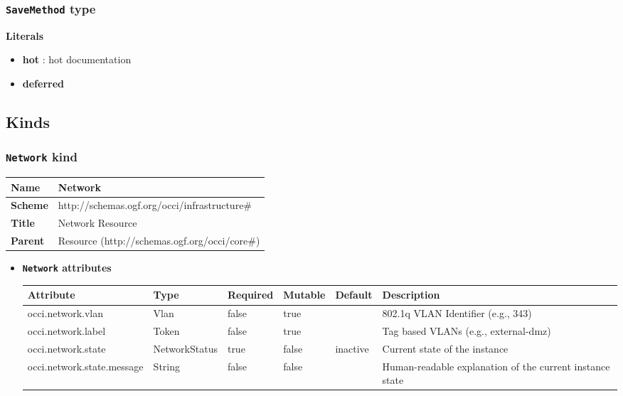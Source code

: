 \subsubsection{\texttt{SaveMethod} type}

\textbf{Literals}
\begin{itemize}
\item \textbf{hot}   : hot documentation
\end{itemize}
\begin{itemize}
\item \textbf{deferred} 
\end{itemize}

\subsection{Kinds}
\subsubsection{\texttt{Network} kind}
\begin{center}
\begin{tabular}{|l|l|}
  \hline
  \textbf{Name} & Network \\
  \hline  
  \textbf{Scheme} & http://schemas.ogf.org/occi/infrastructure\# \\
  \hline
  \textbf{Title} & Network Resource \\
  \hline
  \textbf{Parent} & Resource (http://schemas.ogf.org/occi/core\#) \\
  \hline
\end{tabular}
\end{center}
\begin{itemize}
\item \textbf{\texttt{Network} attributes}

\begin{tabularx}{\textwidth}{|l|l|p{1.4cm}|p{1.3cm}|l|X|}
  \hline
  \textbf{Attribute} & \textbf{Type} & \textbf{Required} & \textbf{Mutable} & \textbf{Default} & \textbf{Description} \\
  \hline  
  occi.network.vlan & Vlan & false & true &  & 802.1q VLAN Identifier (e.g., 343) \\
  \hline
  occi.network.label & Token & false & true &  & Tag based VLANs (e.g., external-dmz) \\
  \hline
  occi.network.state & NetworkStatus & true & false & inactive & Current state of the instance \\
  \hline
  occi.network.state.message & String & false & false &  & Human-readable explanation of the current instance state \\
  \hline
\end{tabularx}
\end{itemize}

